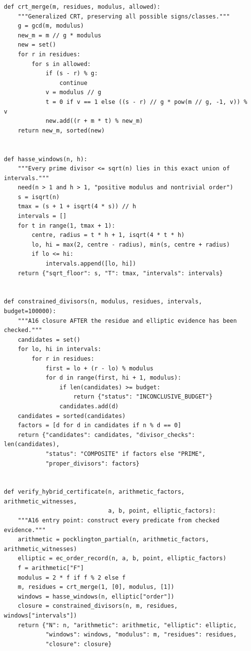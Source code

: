 \documentclass[11pt,a4paper]{article}
\theoremstyle{definition}\newtheorem{definition}[theorem]{Definition}
\theoremstyle{remark}\newtheorem{remark}[theorem]{Remark}
\begin{document}
\begin{lstlisting}[label=lst:certificates]
def crt_merge(m, residues, modulus, allowed):
    """Generalized CRT, preserving all possible signs/classes."""
    g = gcd(m, modulus)
    new_m = m // g * modulus
    new = set()
    for r in residues:
        for s in allowed:
            if (s - r) % g:
                continue
            v = modulus // g
            t = 0 if v == 1 else ((s - r) // g * pow(m // g, -1, v)) % v
            new.add((r + m * t) % new_m)
    return new_m, sorted(new)


def hasse_windows(n, h):
    """Every prime divisor <= sqrt(n) lies in this exact union of intervals."""
    need(n > 1 and h > 1, "positive modulus and nontrivial order")
    s = isqrt(n)
    tmax = (s + 1 + isqrt(4 * s)) // h
    intervals = []
    for t in range(1, tmax + 1):
        centre, radius = t * h + 1, isqrt(4 * t * h)
        lo, hi = max(2, centre - radius), min(s, centre + radius)
        if lo <= hi:
            intervals.append([lo, hi])
    return {"sqrt_floor": s, "T": tmax, "intervals": intervals}


def constrained_divisors(n, modulus, residues, intervals, budget=100000):
    """A16 closure AFTER the residue and elliptic evidence has been checked."""
    candidates = set()
    for lo, hi in intervals:
        for r in residues:
            first = lo + (r - lo) % modulus
            for d in range(first, hi + 1, modulus):
                if len(candidates) >= budget:
                    return {"status": "INCONCLUSIVE_BUDGET"}
                candidates.add(d)
    candidates = sorted(candidates)
    factors = [d for d in candidates if n % d == 0]
    return {"candidates": candidates, "divisor_checks": len(candidates),
            "status": "COMPOSITE" if factors else "PRIME",
            "proper_divisors": factors}


def verify_hybrid_certificate(n, arithmetic_factors, arithmetic_witnesses,
                              a, b, point, elliptic_factors):
    """A16 entry point: construct every predicate from checked evidence."""
    arithmetic = pocklington_partial(n, arithmetic_factors, arithmetic_witnesses)
    elliptic = ec_order_record(n, a, b, point, elliptic_factors)
    f = arithmetic["F"]
    modulus = 2 * f if f % 2 else f
    m, residues = crt_merge(1, [0], modulus, [1])
    windows = hasse_windows(n, elliptic["order"])
    closure = constrained_divisors(n, m, residues, windows["intervals"])
    return {"N": n, "arithmetic": arithmetic, "elliptic": elliptic,
            "windows": windows, "modulus": m, "residues": residues,
            "closure": closure}



\end{lstlisting}
\end{document}
